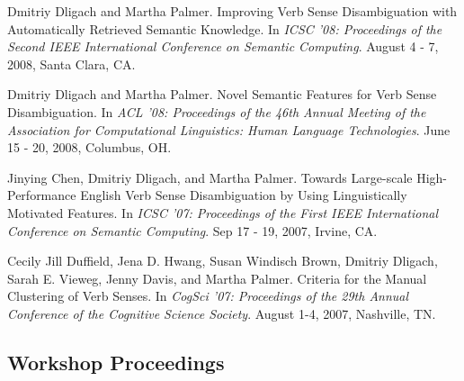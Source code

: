 \documentclass[letterpaper]{article}
\renewenvironment{itemize}{
  \begin{list}{}{
    \setlength{\leftmargin}{1.5em}
  }
}{
  \end{list}
}
\begin{document}
\begin{itemize}
\item Dmitriy Dligach and Martha Palmer. Improving Verb Sense Disambiguation with Automatically Retrieved Semantic Knowledge. In \emph {ICSC '08: Proceedings of the Second IEEE International Conference on Semantic Computing}. August 4 - 7, 2008, Santa Clara, CA.
\item Dmitriy Dligach and Martha Palmer. Novel Semantic Features for Verb Sense Disambiguation. In \emph {ACL '08: Proceedings of the 46th Annual Meeting of the Association for Computational Linguistics: Human Language Technologies}. June 15 - 20, 2008, Columbus, OH.
\item Jinying Chen, Dmitriy Dligach, and Martha Palmer. Towards Large-scale High-Performance English Verb Sense Disambiguation by Using Linguistically Motivated Features. In \emph {ICSC '07: Proceedings of the First IEEE International Conference on Semantic Computing}. Sep 17 - 19, 2007, Irvine, CA.
\item Cecily Jill Duffield, Jena D. Hwang, Susan Windisch Brown, Dmitriy Dligach, Sarah E. Vieweg, Jenny Davis, and Martha Palmer. Criteria for the Manual Clustering of Verb Senses. In \emph {CogSci '07: Proceedings of the 29th Annual Conference of the Cognitive Science Society}. August 1-4, 2007, Nashville, TN.
\end{itemize}

\subsection*{Workshop Proceedings}
\end{document}
